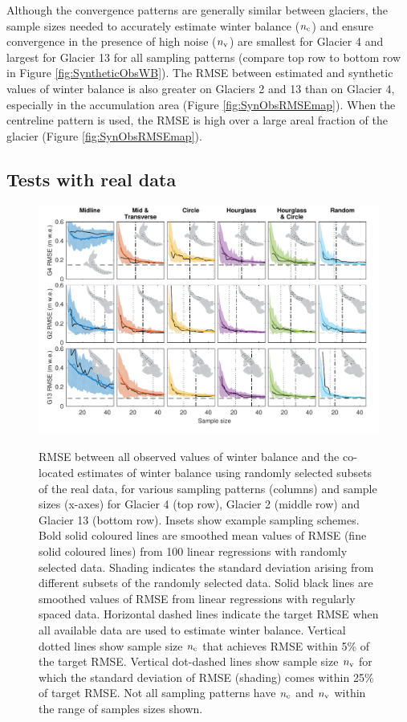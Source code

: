 \documentclass[twocolumn,letterpaper]{igs}
\begin{document}
Although the convergence patterns are generally similar between glaciers, the sample sizes needed to accurately estimate winter balance ($n_{\rm c}$) and ensure convergence in the presence of high noise ($n_{\rm v}$) are smallest for Glacier 4 and largest for Glacier 13 for all sampling patterns (compare top row to bottom row in Figure  \ref{fig:SyntheticObsWB}). The RMSE between estimated and synthetic values of winter balance is also greater on Glaciers 2 and 13 than on Glacier 4, especially in the accumulation area (Figure \ref{fig:SynObsRMSEmap}). When the centreline pattern is used, the RMSE is high over a large areal fraction of the glacier (Figure \ref{fig:SynObsRMSEmap}).

\subsection{Tests with real data}

\begin{figure}
	\centering
	\includegraphics[width =\textwidth]{Pulwicki_Fig5.pdf}\\
	\caption{RMSE between all observed values of winter balance and the co-located estimates of winter balance using randomly selected subsets of the real data, for various sampling patterns (columns) and sample sizes (x-axes) for Glacier 4 (top row), Glacier 2 (middle row) and Glacier 13 (bottom row). Insets show example sampling schemes. Bold solid coloured lines are smoothed mean values of RMSE (fine solid coloured lines) from 100 linear regressions with randomly selected data. Shading indicates the standard deviation arising from different subsets of the randomly selected data. Solid black lines are smoothed values of RMSE from linear regressions with regularly spaced data. Horizontal dashed lines indicate the target RMSE when all available data are used to estimate winter balance.  Vertical dotted lines show sample size $n_{\rm c}$ that achieves RMSE within 5\% of the target RMSE. Vertical dot-dashed lines show sample size $n_{\rm v}$ for which the standard deviation of  RMSE (shading) comes within 25\% of target RMSE. Not all sampling patterns have $n_{\rm c}$ and $n_{\rm v}$ within the range of samples sizes shown.}
	\label{fig:RealObsWB}
\end{figure}
\end{document}
